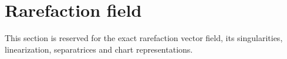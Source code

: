 \section{Rarefaction field}

This section is reserved for the exact rarefaction vector field, its singularities, linearization, separatrices and chart representations.
